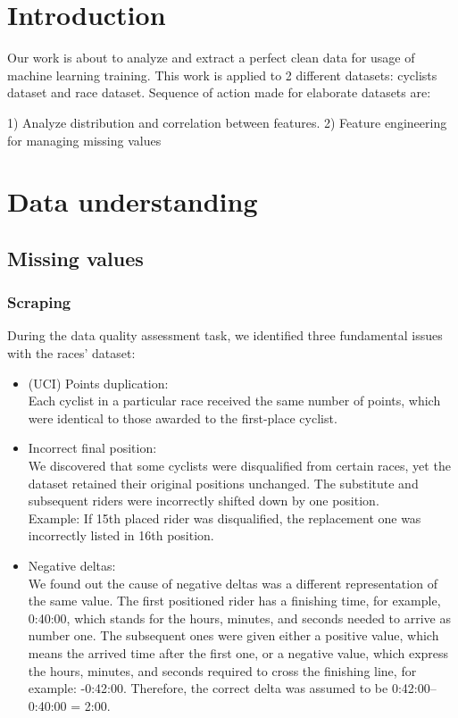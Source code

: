 \documentclass[a4paper, twoside,openright]{report}
\begin{document}



\section{Introduction}
Our work is about to analyze and extract a perfect clean data for usage of machine learning training. This work is applied to 2 different datasets: cyclists dataset and race dataset. Sequence of action made for elaborate datasets are:

1) Analyze distribution and correlation between features.
2) Feature engineering for managing missing values

\section{Data understanding}

\subsection{Missing values}
\subsubsection{Scraping}

During the data quality assessment task, we identified three fundamental issues with the races' dataset:
\begin{itemize}

\item (UCI) Points duplication: \\ 
Each cyclist in a particular race received the same number of points,  which were identical to those awarded to the first-place cyclist. 
\item  Incorrect final position: \\
We discovered that some cyclists were disqualified from certain races, yet the dataset retained their original positions unchanged. The substitute and subsequent riders were incorrectly shifted down by one position. \\
Example: If 15th placed rider was disqualified, the replacement one was incorrectly listed in 16th position.
\item Negative deltas: \\
We found out the cause of negative deltas was a different representation of the same value. The first positioned rider has a finishing time, for example, 0:40:00, which stands for the hours, minutes, and seconds needed to arrive as number one. The subsequent ones were given either a positive value, which means the arrived time after the first one, or a negative value, which express the hours, minutes, and seconds required to cross the finishing line, for example: -0:42:00. Therefore, the correct delta was assumed to be 0:42:00–0:40:00 = 2:00.
\end{itemize}
\end{document}
